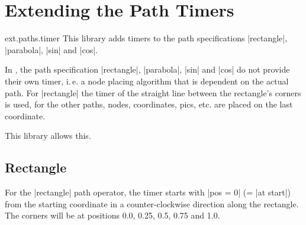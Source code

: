%
%
%

\section{Extending the Path Timers}
\label{library:timer}

\begin{tikzlibrary}{ext.paths.timer}
  This library adds timers to the path specifications |rectangle|, |parabola|, |sin| and |cos|.
\end{tikzlibrary}

In \tikzname, the path specification |rectangle|, |parabola|, |sin| and |cos| do not provide
their own timer, i.\,e. a node placing algorithm that is dependent on the actual path.
For |rectangle| the timer of the straight line between the rectangle's corners is used, for
the other paths, nodes, coordinates, pics, etc. are placed on the last coordinate.

This library allows this.

\subsection{Rectangle}

For the |rectangle| path operator, the timer starts with |pos = 0| (= |at start|) from
the starting coordinate in a counter-clockwise direction along the rectangle.
The corners will be at positions 0.0, 0.25, 0.5, 0.75 and 1.0.

\begin{codeexample}[width=10cm,preamble=\usetikzlibrary{ext.paths.timer}]
\end{codeexample}

